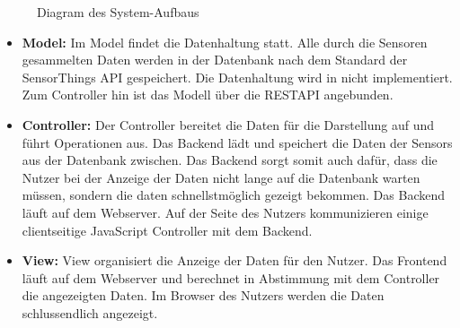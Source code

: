 \begin{figure}
    \caption{Diagram des System-Aufbaus}
\end{figure}
\begin{itemize}
    \item \textbf{Model:} Im Model findet die Datenhaltung statt. Alle durch die Sensoren gesammelten Daten werden in der Datenbank nach dem Standard der \gls{SensorThings API} gespeichert. Die Datenhaltung wird in \softwarename nicht implementiert.
        Zum Controller hin ist das Modell über die \gls{RESTAPI} angebunden.
    \item \textbf{Controller:} Der Controller bereitet die Daten für die Darstellung auf und führt Operationen aus.
        Das \softwarename Backend lädt und speichert die Daten der \glspl{Sensor} aus der Datenbank zwischen. Das Backend sorgt somit auch dafür, dass die Nutzer bei der Anzeige der Daten nicht lange auf die Datenbank warten müssen, sondern die daten schnellstmöglich gezeigt bekommen.
        Das \softwarename Backend läuft auf dem Webserver. Auf der Seite des Nutzers kommunizieren einige clientseitige \gls{JavaScript} Controller mit dem Backend.
    \item \textbf{View:} View organisiert die Anzeige der Daten für den Nutzer.
        Das \softwarename Frontend läuft auf dem Webserver und berechnet in Abstimmung mit dem Controller die angezeigten Daten.
        Im Browser des Nutzers werden die Daten schlussendlich angezeigt.
\end{itemize}
